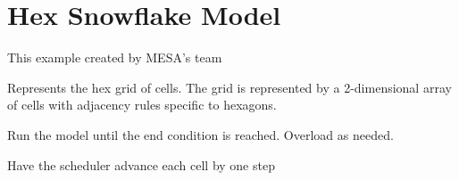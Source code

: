 \documentclass[letterpaper,10pt,english]{sphinxmanual}
\begin{document}
\label{\detokenize{index:module-examples.hex_snowflake.hex_snowflake.model}}

\chapter{Hex Snowflake Model}
\label{\detokenize{index:hex-snowflake-model}}
This example created by MESA’s team

\begin{fulllineitems}
\label{\detokenize{index:examples.hex_snowflake.hex_snowflake.model.HexSnowflake}}
Represents the hex grid of cells. The grid is represented by a 2-dimensional array of cells with adjacency rules specific to hexagons.

\begin{fulllineitems}
\label{\detokenize{index:examples.hex_snowflake.hex_snowflake.model.HexSnowflake.run_model}}
Run the model until the end condition is reached. Overload as
needed.

\end{fulllineitems}


\begin{fulllineitems}
\label{\detokenize{index:examples.hex_snowflake.hex_snowflake.model.HexSnowflake.step}}
Have the scheduler advance each cell by one step

\end{fulllineitems}


\end{fulllineitems}
\end{document}
